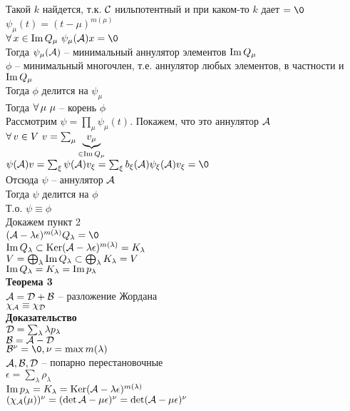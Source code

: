 \documentclass[12pt]{article}
\begin{document}
Такой $k$ найдется, т.к. $\mcC$ нильпотентный и при каком-то $k$ дает $= \0$\\
$\psi_\mu (t) = (t-\mu)^{m(\mu)}$\\
$\fall x \in \im Q_\mu\ \psi_\mu(\mcA)x = \0$\\
Тогда $\psi_\mu(\mcA)$ -- минимальный аннулятор элементов $\im Q_\mu$\\
$\phi$ -- минимальный многочлен, т.е. аннулятор любых элементов, в частности и $\im Q_\mu$\\
Тогда $\phi$ делится на $\psi_\mu$\\
Тогда $\fall \mu\ \mu$ -- корень $\phi$\\
Рассмотрим $\psi = \prod_\mu \psi_\mu (t)$. Покажем, что это аннулятор $\mcA$\\
$\fall v \in V\ v = \sum_\mu \ub{\in \im Q_\mu}{v_\mu}$\\
$\psi(\mcA)v = \sum_\xi \psi(\mcA)v_\xi = \sum_\xi b_\xi(\mcA)\psi_\xi(\mcA)v_\xi = \0$\\
Отсюда $\psi$ -- аннулятор $\mcA$\\
Тогда $\psi$ делится на $\phi$\\
Т.о. $\psi \equiv \phi$\\
Докажем пункт 2\\
$(\mcA - \lambda \epsilon)^{m(\lambda)}Q_\lambda = \0$\\
$\im Q_\lambda \subset \ker (\mcA - \lambda\epsilon)^{m(\lambda)} = K_\lambda$\\
$V = \bigoplus_\lambda \im Q_\lambda \subset \bigoplus_\lambda K_\lambda = V$\\
$\im Q_\lambda = K_\lambda = \im p_\lambda$\\
\textbf{Теорема 3}\\
$\mcA = \mcD + \mcB$ -- разложение Жордана\\
$\chi_\mcA \equiv \chi_\mcD$\\
\textbf{Доказательство}\\
$\mcD = \sum_\lambda \lambda p_\lambda$\\
$\mcB = \mcA - \mcD$\\
$\mcB^\nu = \0, \nu = \max m(\lambda)$\\
$\mcA,\mcB,\mcD$ -- попарно перестановочные\\
$\epsilon = \sum_\lambda \rho_\lambda$\\
$\im p_\lambda = K_\lambda = \ker (\mcA - \lambda \epsilon)^{m(\lambda)}$\\
$(\chi_\mcA(\mu))^\nu = (\det \mcA - \mu \epsilon)^\nu = \det (\mcA - \mu \epsilon)^\nu$\\
\end{document}
